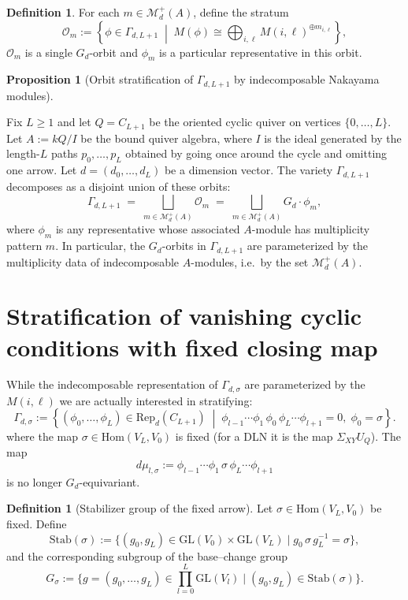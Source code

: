 \documentclass{article}
\theoremstyle{definition}
\newtheorem{proposition}[theorem]{Proposition}
\newtheorem{definition}[theorem]{Definition}
\begin{document}
\begin{definition}
    For each $m \in \mathcal M_d^+(A)$, define the stratum
\[
\mathcal{O}_m
:=
\left\{
\phi \in \Gamma_{d,L+1}
\;\middle|\;
M(\phi) \cong
\bigoplus_{i,\ell} M(i,\ell)^{\oplus m_{i,\ell}}
\right\},
\]
$\mathcal{O}_m$ is a single $G_d$-orbit and $\phi_m$ is a particular representative in this orbit. 
\end{definition}
\begin{proposition}[Orbit stratification of $\Gamma_{d,L+1}$ by indecomposable Nakayama modules]
\label{prop:Gamma_orbit_stratification}

Fix $L \ge 1$ and let $Q = C_{L+1}$ be the oriented cyclic quiver on vertices
$\{0,\dots,L\}$.  
Let $A := kQ/I$ be the bound quiver algebra, where $I$ is the ideal generated by the length-$L$
paths $p_0,\dots,p_{L}$ obtained by going once around the cycle and omitting one arrow.
Let $d=(d_0,\dots,d_L)$ be a dimension vector. 
The variety $\Gamma_{d,L+1}$ decomposes as a disjoint union of these orbits:
\[
\Gamma_{d,L+1}
\;=\;
\bigsqcup_{m \in \mathcal M_d^+(A)} \mathcal{O}_m
\;=\;
\bigsqcup_{m \in \mathcal M_d^+(A)} G_d \cdot \phi_m,
\]
where $\phi_m$ is any representative whose associated $A$-module has multiplicity pattern $m$.
\noindent
In particular, the $G_d$-orbits in $\Gamma_{d,L+1}$ are parameterized by the
multiplicity data of indecomposable $A$-modules, i.e.\ by the set
$\mathcal M_d^+(A)$.
\end{proposition}
\section{Stratification of vanishing cyclic conditions with fixed closing map}
While the indecomposable representation of $\Gamma_{d,\sigma}$ are parameterized by the $M(i,\ell)$ we are actually interested in stratifying:
\begin{equation*}
    \Gamma_{d,\sigma} := \left\{(\phi_0,\ldots,\phi_{L})\in \mathrm{Rep}_d(C_{L+1})\;\middle|\; \phi_{l-1}\cdots\phi_1\,\phi_{0}\,\phi_L\cdots\phi_{l+1} = 0,\; \phi_{0}=\sigma\right\}.
\end{equation*}
where the map $\sigma\in \mathrm{Hom}(V_L,V_0)$ is fixed (for a DLN it is the map $\Sigma_{XY}U_Q$).
The map
\begin{equation*}
    d\mu_{l,\sigma} := \phi_{l-1}\cdots\phi_1\,\sigma\,\phi_L\cdots\phi_{l+1}
\end{equation*}
is no longer $G_d$-equivariant.

\begin{definition}[Stabilizer group of the fixed arrow]\label{def:stabilizer-sigma}
Let $\sigma\in\mathrm{Hom}(V_L,V_0)$ be fixed. Define
\[
\mathrm{Stab}(\sigma):=\{(g_0,g_L)\in \mathrm{GL}(V_0)\times \mathrm{GL}(V_L)\mid g_0\,\sigma\,g_L^{-1}=\sigma\},
\]
and the corresponding subgroup of the base--change group
\[
G_\sigma:=\{g=(g_0,\ldots,g_L)\in \prod_{l=0}^L\mathrm{GL}(V_l)\mid (g_0,g_L)\in \mathrm{Stab}(\sigma)\}.
\]
\end{definition}
\end{document}
